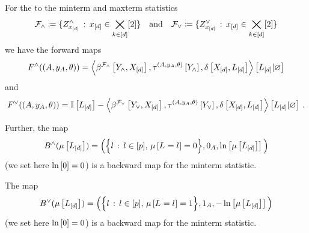 \begin{theorem}
    For the \HybridLogicNetworks{} to the minterm and maxterm statistics
    \begin{align*}
        \mathcal{F}_{\land} \coloneqq \{ Z^{\land}_{x_{[d]}} \,:\, x_{[d]}\in\bigtimes_{k\in[d]}[2]\}
        \quad \text{and} \quad
        \mathcal{F}_{\lor} \coloneqq \{ Z^{\lor}_{x_{[d]}} \,:\, x_{[d]}\in\bigtimes_{k\in[d]}[2]\}
    \end{align*}
    we have the forward maps
    \begin{align*}
        F^{\land}((A,y_{A},\theta))
        = \left\langle \beta^{\mathcal{F}_{\land}}\left[Y_{\land},X_{[d]}\right],
            \tau^{(A,y_{A},\theta)}\left[Y_{\land}\right],\delta\left[X_{[d]},L_{[d]}\right]\right\rangle \left[ L_{[d]} | \varnothing \right]
    \end{align*}
    and
    \begin{align*}
        F^{\lor}((A,y_{A},\theta))
        = \mathbb{I}\left[L_{[d]}\right] - \left\langle \beta^{\mathcal{F}_{\lor}}\left[Y_{\lor},X_{[d]}\right],
            \tau^{(A,y_{A},\theta)}\left[Y_{\lor}\right],\delta\left[X_{[d]},L_{[d]}\right]\right\rangle \left[ L_{[d]} | \varnothing \right] \, .
    \end{align*}

    Further, the map
    \begin{align*}
        B^{\land}(\mu\left[L_{[d]}\right])
        = \Big(\Big\{ l \,:\, l\in[p] ,\, \mu\left[L_{}=l_{}\right]=0 \Big\},0_{A},\ln \left[ \mu\left[L_{[d]}\right] \right]\Big)
    \end{align*}
    (we set here $\ln \left[ 0 \right]=0$) is a backward map for the minterm statistic.

    The map
    \begin{align*}
        B^{\lor}(\mu\left[L_{[d]}\right])
        = \Big(\Big\{ l \,:\, l\in[p] ,\, \mu\left[L_{}=l_{}\right]=1 \Big\},1_{A},-\ln \left[ \mu\left[L_{[d]}\right] \right]\Big)
    \end{align*}
    (we set here $\ln \left[ 0 \right]=0$) is a backward map for the minterm statistic.


\end{theorem}
